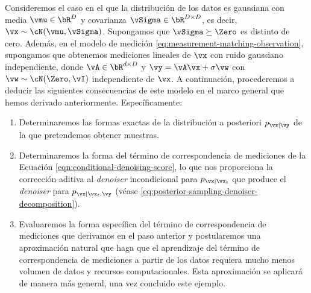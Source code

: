 \documentclass[../../book-main_es.tex]{subfiles}
\begin{document}
\begin{example}\label{example:denoising-conditional-gaussian}
    Consideremos el caso en el que la distribución de los datos es gaussiana con
    media $\vmu \in
    \bR^D$ y
    covarianza $\vSigma \in \bR^{D \times D}$, es decir, $\vx \sim
    \cN(\vmu, \vSigma)$.
    Supongamos que $\vSigma \succeq \Zero$ es distinto de cero.
    Además, en el modelo de medición
    \eqref{eq:measurement-matching-observation},
    supongamos que obtenemos mediciones lineales de $\vx$ con ruido gaussiano independiente, 
    donde $\vA \in \bR^{d \times D}$ y $\vy = \vA \vx + \sigma \vw$
    con $\vw \sim \cN(\Zero, \vI)$ independiente de $\vx$.
    A continuación, procederemos a deducir las siguientes consecuencias de este modelo en
    el marco general que hemos derivado anteriormente. Específicamente:
    \begin{enumerate}
        \item Determinaremos las formas exactas de la distribución a posteriori
            $p_{\vx \mid \vy}$ de la que pretendemos obtener muestras.
        \item Determinaremos la forma del término de correspondencia de mediciones de la Ecuación
            \eqref{eqn:conditional-denoising-score}, lo que nos proporciona la corrección aditiva
            al \textit{denoiser} incondicional para $p_{\vx \mid
            \vx_t}$ que
            produce el \textit{denoiser} para $p_{\vx \mid \vx_t, \vy}$ (véase
            \eqref{eq:posterior-sampling-denoiser-decomposition}).
        \item Evaluaremos la forma específica del término de
            correspondencia de mediciones que
            derivamos en el paso anterior y postularemos una aproximación natural que
            haga que el aprendizaje
            del término de correspondencia de mediciones a partir de los datos requiera
            mucho menos volumen de datos y recursos computacionales. Esta aproximación se
            aplicará de manera más
            general, una vez concluido este ejemplo.
    \end{enumerate}


\end{example}
\end{document}
